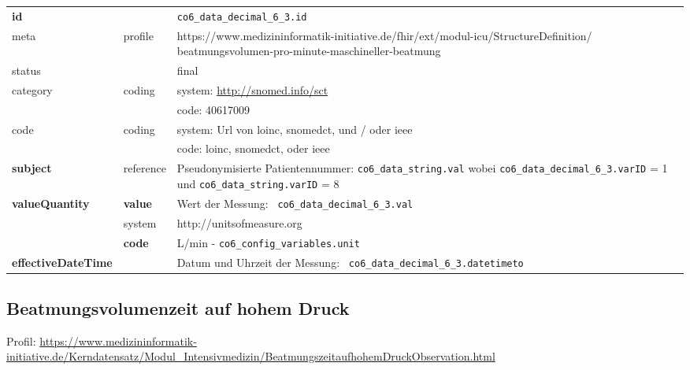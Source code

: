 \begin{longtable}{|l|l|p{7.5cm}|}
        \hline
        \rowcolor{lightgray} \multicolumn{3}{|l|}{Data Mapping (inhaltlich)} \\ \hline
        \textbf{id} &  & \texttt{co6\_data\_decimal\_6\_3.id} \\ \hline
	meta & profile & https://www.medizininformatik-initiative.de/fhir/ext/modul-icu/StructureDefinition/ beatmungsvolumen-pro-minute-maschineller-beatmung \\ \hline 
	status &  & final   \\ \hline 
	category & coding & system: \url{http://snomed.info/sct} \\
\cline{3-3}
	& & code: 40617009 \\ \hline
	code & coding & system: Url von \ac{loinc}, \ac{snomedct}, und / oder \ac{ieee} \\ 
	\cline{3-3} 
	 &  & code: \ac{loinc}, \ac{snomedct}, oder \ac{ieee} \\ \hline
	\textbf{subject} & reference & Pseudonymisierte Patientennummer: \texttt{co6\_data\_string.val} wobei \texttt{co6\_data\_decimal\_6\_3.varID} = 1 und \texttt{co6\_data\_string.varID} = 8 \\ \hline
	 \textbf{valueQuantity}  & \textbf{value} & Wert der Messung: \texttt{
co6\_data\_decimal\_6\_3.val} \\
        \cline{2-3}
         & system & http://unitsofmeasure.org \\
         \cline{2-3}
         & \textbf{code} &
L/min - \texttt{co6\_config\_variables.unit}
\\ \hline
     \textbf{effectiveDateTime}  & & Datum und Uhrzeit der Messung: \texttt{
co6\_data\_decimal\_6\_3.datetimeto} \\
     \hline
\end{longtable}

\subsection{Beatmungsvolumenzeit auf hohem Druck} 
Profil: \url{https://www.medizininformatik-initiative.de/Kerndatensatz/Modul_Intensivmedizin/BeatmungszeitaufhohemDruckObservation.html}

